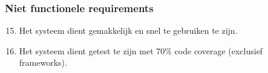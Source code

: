 \begin{enumerate}[{R}1]
\end{enumerate}

\subsubsection{Niet functionele requirements}
\begin{enumerate}[{R}1]
\setcounter{enumi}{14}
	\item Het systeem dient gemakkelijk en snel te gebruiken te zijn.
	\item Het systeem dient getest te zijn met 70\% code coverage (exclusief frameworks).
\end{enumerate}